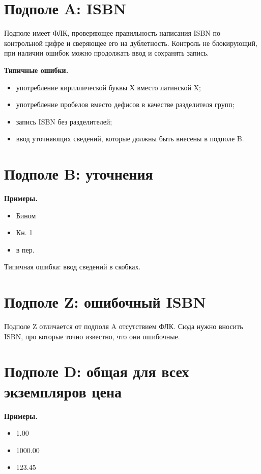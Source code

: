 \section{Подполе A: ISBN}

Подполе имеет ФЛК, проверяющее правильность написания ISBN по контрольной цифре и сверяющее его на дублетность. Контроль не блокирующий, при наличии ошибок можно продолжать ввод и сохранять запись.

\textbf{Типичные ошибки.}

\begin{itemize}
    \item употребление кириллической буквы Х вместо латинской X;
    \item употребление пробелов вместо дефисов в качестве разделителя групп;
    \item запись ISBN без разделителей;
    \item ввод уточняющих сведений, которые должны быть внесены в подполе B.
\end{itemize}

\section{Подполе B: уточнения}

\textbf{Примеры.}

\begin{itemize}
    \item Бином
    \item Кн. 1
    \item в пер.
\end{itemize}

Типичная ошибка: ввод сведений в скобках.

\section{Подполе Z: ошибочный ISBN}

Подполе Z отличается от подполя A отсутствием ФЛК. Сюда нужно вносить ISBN, про которые точно известно, что они ошибочные.

\section{Подполе D: общая для всех экземпляров цена}

\textbf{Примеры.}

\begin{itemize}
    \item 1.00
    \item 1000.00
    \item 123.45
\end{itemize}


